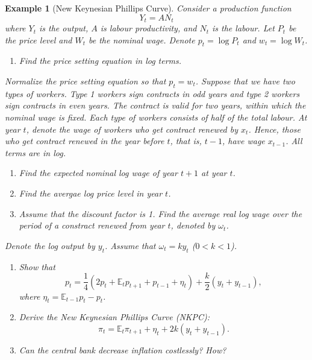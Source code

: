 \documentclass[12pt]{article}
\newtheorem{example}{Example}
\begin{document}
\begin{example}[New Keynesian Phillips Curve]
    Consider a production function
    \[Y_t = A N_t\]
    where $Y_t$ is the output, $A$ is labour productivity, and $N_t$ is the labour. Let $P_t$ be the price level and $W_t$ be the nominal wage. Denote $p_t = \log P_t$ and $w_t = \log W_t$.
    \begin{enumerate}[label=(\arabic*)]
        \item Find the price setting equation in log terms.
        \vspace{60pt}
    \end{enumerate}
    Normalize the price setting equation so that $p_t = w_t$. Suppose that we have two types of workers. Type 1 workers sign contracts in odd years and type 2 workers sign contracts in even years. The contract is valid for two years, within which the nominal wage is fixed. Each type of workers consists of half of the total labour. At year $t$, denote the wage of workers who get contract renewed by $x_t$. Hence, those who get contract renewed in the year before $t$, that is, $t-1$, have wage $x_{t-1}$. All terms are in log.
    \begin{enumerate}[label=(\arabic*),resume]
        \item Find the expected nominal log wage of year $t+1$ at year $t$.
        \vspace{36pt}
        \item Find the avergae log price level in year $t$.
        \vspace{36pt}
        \item Assume that the discount factor is 1. Find the average real log wage over the period of a constract renewed from year $t$, denoted by $\omega_t$.
        \vspace{60pt}
    \end{enumerate}
    Denote the log output by $y_t$. Assume that $\omega_t = k y_t$ ($0<k<1$).
    \begin{enumerate}[label=(\arabic*),resume]
        \item Show that
        \[p_t = \frac{1}{4}(2p_t + \mathbb{E}_t p_{t+1} + p_{t-1} + \eta_t) + \frac{k}{2}(y_t + y_{t-1}),\]
        where $\eta_t = \mathbb{E}_{t-1} p_t - p_t$.
        \vspace{80pt}
        \item Derive the New Keynesian Phillips Curve (NKPC):
        \[\pi_t = \mathbb{E}_t \pi_{t+1} + \eta_t + 2k(y_t + y_{t-1}).\]
        \vspace{60pt}
        \item Can the central bank decrease inflation costlessly? How?
        \vspace{24pt}
    \end{enumerate}
\end{example}
\end{document}
